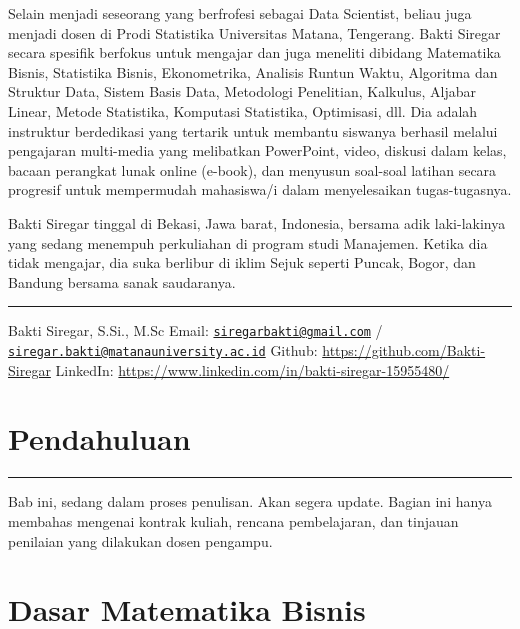 \documentclass[
]{book}
\begin{document}
Selain menjadi seseorang yang berfrofesi sebagai Data Scientist, beliau juga menjadi dosen di Prodi Statistika Universitas Matana, Tengerang. Bakti Siregar secara spesifik berfokus untuk mengajar dan juga meneliti dibidang Matematika Bisnis, Statistika Bisnis, Ekonometrika, Analisis Runtun Waktu, Algoritma dan Struktur Data, Sistem Basis Data, Metodologi Penelitian, Kalkulus, Aljabar Linear, Metode Statistika, Komputasi Statistika, Optimisasi, dll. Dia adalah instruktur berdedikasi yang tertarik untuk membantu siswanya berhasil melalui pengajaran multi-media yang melibatkan PowerPoint, video, diskusi dalam kelas, bacaan perangkat lunak online (e-book), dan menyusun soal-soal latihan secara progresif untuk mempermudah mahasiswa/i dalam menyelesaikan tugas-tugasnya.

Bakti Siregar tinggal di Bekasi, Jawa barat, Indonesia, bersama adik laki-lakinya yang sedang menempuh perkuliahan di program studi Manajemen. Ketika dia tidak mengajar, dia suka berlibur di iklim Sejuk seperti Puncak, Bogor, dan Bandung bersama sanak saudaranya.

\begin{center}\rule{0.5\linewidth}{0.5pt}\end{center}

Bakti Siregar, S.Si., M.Sc
Email: \href{mailto:siregarbakti@gmail.com}{\nolinkurl{siregarbakti@gmail.com}} / \href{mailto:siregar.bakti@matanauniversity.ac.id}{\nolinkurl{siregar.bakti@matanauniversity.ac.id}}
Github: \url{https://github.com/Bakti-Siregar}
LinkedIn: \url{https://www.linkedin.com/in/bakti-siregar-15955480/}

\hypertarget{Pendahuluan}{%
\chapter{Pendahuluan}\label{Pendahuluan}}

\begin{center}\rule{0.5\linewidth}{0.5pt}\end{center}

Bab ini, sedang dalam proses penulisan. Akan segera update. Bagian ini hanya membahas mengenai kontrak kuliah, rencana pembelajaran, dan tinjauan penilaian yang dilakukan dosen pengampu.

\hypertarget{Dasar-Matematika-Bisnis}{%
\chapter{Dasar Matematika Bisnis}\label{Dasar-Matematika-Bisnis}}
\end{document}
